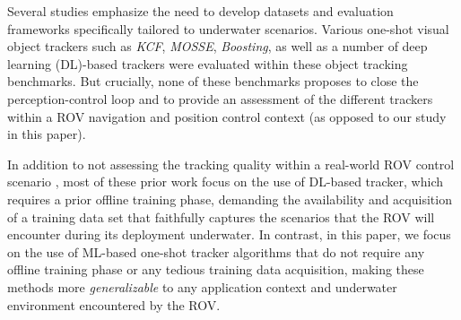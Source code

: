 Several studies \cite{9032954, Panetta:IJOE:2022, Alawode_2022_ACCV} emphasize the need to develop datasets and evaluation frameworks specifically tailored to underwater scenarios. Various one-shot visual object trackers such as \textit{KCF}, \textit{MOSSE}, \textit{Boosting}, as well as a number of deep learning (DL)-based trackers were evaluated within these object tracking benchmarks. But crucially, none of these benchmarks proposes to close the perception-control loop and to provide an assessment of the different trackers within a ROV navigation and position control context (as opposed to our study in this paper).

In addition to not assessing the tracking quality within a real-world ROV control scenario \cite{10638434}, most of these prior work focus on the use of DL-based tracker, which requires a prior offline training phase, demanding the availability and acquisition of a training data set that faithfully captures the scenarios that the ROV will encounter during its deployment underwater. In contrast, in this paper, we focus on the use of ML-based one-shot tracker algorithms that do not require any offline training phase or any tedious training data acquisition, making these methods more \textit{generalizable} to any application context and underwater environment encountered by the ROV. 



 
